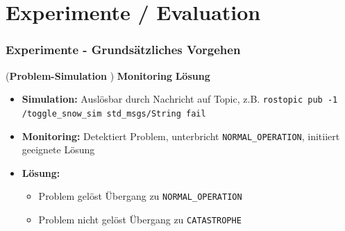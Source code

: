 \documentclass{beamer}
\newcommand{\code}[1]{\colorbox{light-gray}{\texttt{#1}}}
\begin{document}

\section{Experimente / Evaluation}

\begin{frame}
  \frametitle{Experimente - Grundsätzliches Vorgehen}
  (\textbf{Problem-Simulation} \textrightarrow) \thinspace \textbf{Monitoring} \textrightarrow \thinspace \textbf{Lösung}
  \begin{itemize}
    \item \textbf{Simulation:} Auslösbar durch Nachricht auf Topic, z.B. \code{rostopic pub -1 /toggle\_snow\_sim std\_msgs/String fail}
    \item \textbf{Monitoring:} Detektiert Problem, unterbricht \code{NORMAL\_OPERATION}, initiiert geeignete Lösung
    \item \textbf{Lösung:}
    \begin{itemize}
      \item Problem gelöst \textrightarrow \thinspace Übergang zu \code{NORMAL\_OPERATION}
      \item Problem nicht gelöst \textrightarrow \thinspace Übergang zu \code{CATASTROPHE}
    \end{itemize}
  \end{itemize}
\end{frame}
\end{document}
